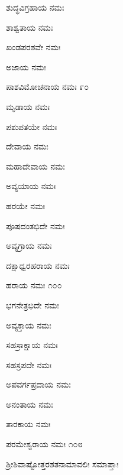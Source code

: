ಶುದ್ಧವಿಗ್ರಹಾಯ ನಮಃ

ಶಾಶ್ವತಾಯ ನಮಃ

ಖಂಡಪರಶವೇ ನಮಃ

ಅಜಾಯ ನಮಃ

ಪಾಶವಿಮೋಚನಾಯ ನಮಃ \num{೯೦}

ಮೃಡಾಯ ನಮಃ

ಪಶುಪತಯೇ ನಮಃ

ದೇವಾಯ ನಮಃ

ಮಹಾದೇವಾಯ ನಮಃ

ಅವ್ಯಯಾಯ ನಮಃ

ಹರಯೇ ನಮಃ

ಪೂಷದಂತಭಿದೇ ನಮಃ

ಅವ್ಯಗ್ರಾಯ ನಮಃ

ದಕ್ಷಾಧ್ವರಹರಾಯ ನಮಃ

ಹರಾಯ ನಮಃ \num{೧೦೦}

ಭಗನೇತ್ರಭಿದೇ ನಮಃ

ಅವ್ಯಕ್ತಾಯ ನಮಃ

ಸಹಸ್ರಾಕ್ಷಾಯ ನಮಃ

ಸಹಸ್ರಪದೇ ನಮಃ

ಅಪವರ್ಗಪ್ರದಾಯ ನಮಃ

ಅನಂತಾಯ ನಮಃ

ತಾರಕಾಯ ನಮಃ

ಪರಮೇಶ್ವರಾಯ ನಮಃ \num{೧೦೮}

\begin{center}
ಶ್ರೀಶಿವಾಷ್ಟೋತ್ತರಶತನಾಮಾವಲಿಃ ಸಮಾಪ್ತಾಃ 
\end{center}


